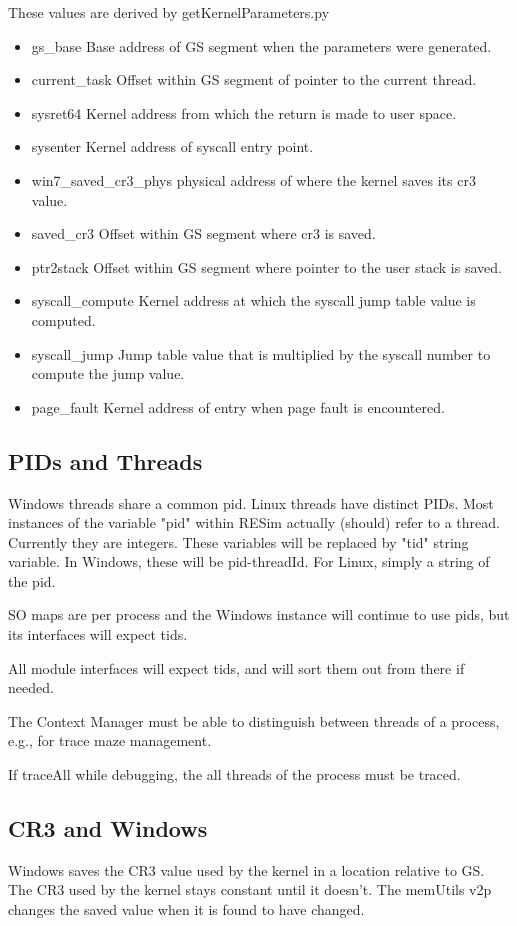 \documentclass[titlepage]{article}
\begin{document}
\begin{appendices}
These values are derived by getKernelParameters.py
\begin{itemize}
\item gs\_base Base address of GS segment when the parameters were generated.
\item current\_task Offset within GS segment of pointer to the current thread.
\item sysret64 Kernel address from which the return is made to user space.  
\item sysenter Kernel address of syscall entry point.
\item win7\_saved\_cr3\_phys physical address of where the kernel saves its cr3 value.
\item saved\_cr3 Offset within GS segment where cr3 is saved.
\item ptr2stack Offset within GS segment where pointer to the user stack is saved.
\item syscall\_compute Kernel address at which the syscall jump table value is computed.
\item syscall\_jump Jump table value that is multiplied by the syscall number to compute the jump value.
\item page\_fault Kernel address of entry when page fault is encountered.
\end{itemize}

\subsection{PIDs and Threads}
Windows threads share a common pid. Linux threads have distinct PIDs.
Most instances of the variable "pid" within RESim actually (should) refer to a thread.
Currently they are integers.
These variables will be replaced by "tid" string variable.  In Windows, these will
be pid-threadId.  For Linux, simply a string of the pid.

SO maps are per process and the Windows instance will continue to use pids, but its
interfaces will expect tids.

All module interfaces will expect tids, and will sort them out from there if needed.

The Context Manager must be able to distinguish between threads of a process, e.g., for trace maze management.

If traceAll while debugging, the all threads of the process must be traced.

\subsection{CR3 and Windows}
Windows saves the CR3 value used by the kernel in a location relative to GS.
The CR3 used by the kernel stays constant until it doesn't.  The memUtils v2p
changes the saved value when it is found to have changed. 


\end{appendices}
\end{document}
